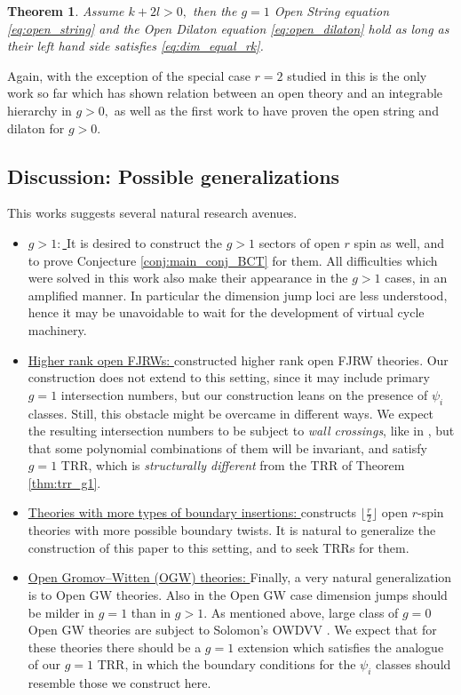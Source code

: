 \documentclass[11pt]{amsart}
\newtheorem{thm}[dummy]{Theorem}
\theoremstyle{definition}
\theoremstyle{remark}
\newcommand{\<}{\left<}
\renewcommand{\>}{\right>}
\numberwithin{equation}{section}
\begin{document}
\begin{thm}\label{thm:open_string_dilaton}
Assume $k+2l>0,$ then the $g=1$ Open String equation \eqref{eq:open_string} and the Open Dilaton equation \eqref{eq:open_dilaton} hold as long as their left hand side satisfies \eqref{eq:dim_equal_rk}.
\end{thm}
Again, with the exception of the special case $r=2$ studied in \cite{Tes2,BT17} this is the only work so far which has shown relation between an open theory and an integrable hierarchy in $g>0,$ as well as the first work to have proven the open string and dilaton for $g>0.$
\subsection{Discussion: Possible generalizations}
This works suggests several natural research avenues. 
\begin{itemize}
    \item \underline{$g>1:$ }It is desired to construct the $g>1$ sectors of open $r$ spin as well, and to prove Conjecture \ref{conj:main_conj_BCT} for them. All difficulties which were solved in this work also make their appearance in the $g>1$ cases, in an amplified manner. In particular the dimension jump loci are less understood, hence it may be unavoidable to wait for the development of virtual cycle machinery. 
    \item \underline{Higher rank open FJRWs: }\cite{GKT2} constructed higher rank open FJRW theories. Our construction does not extend to this setting, since it may include primary $g=1$ intersection numbers, but our construction leans on the presence of $\psi_i$ classes. Still, this obstacle might be overcame in different ways. We expect the resulting intersection numbers to be subject to \emph{wall crossings}, like in \cite{GKT2}, but that some polynomial combinations of them will be invariant, and satisfy $g=1$ TRR, which is \emph{structurally different} from the TRR of Theorem \ref{thm:trr_g1}.
    \item \underline{Theories with more types of boundary insertions: }\cite{TZ2} constructs $\lfloor\frac{r}{2}\rfloor$ open $r$-spin theories with more possible boundary twists. It is natural to generalize the construction of this paper to this setting, and to seek TRRs for them. 
    \item \underline{Open Gromov--Witten (OGW) theories: }
    Finally, a very natural generalization is to Open GW theories. Also in the Open GW case dimension jumps should be milder in $g=1$ than in $g>1.$ 
    As mentioned above, large class of $g=0$ Open GW theories are subject to Solomon's OWDVV \cite{sol_owdvv,solomon2023relative}. We expect that for these theories there should be a $g=1$ extension which satisfies the analogue of our $g=1$ TRR, in which the boundary conditions for the $\psi_i$ classes should resemble those we construct here.
\end{itemize}
\end{document}
